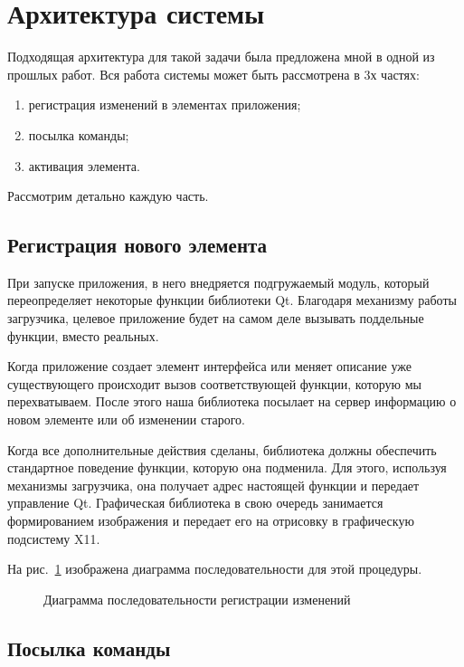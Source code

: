 \section{Архитектура системы}

Подходящая архитектура для такой задачи была предложена мной в одной из прошлых
работ\cite{polshakovinject}. Вся работа системы может быть рассмотрена в 3х
частях:

\begin{enumerate}
    \item регистрация изменений в элементах приложения;
    \item посылка команды;
    \item активация элемента.
\end{enumerate}

Рассмотрим детально каждую часть.

\subsection{Регистрация нового элемента}

При запуске приложения, в него внедряется подгружаемый модуль, который
переопределяет некоторые функции библиотеки Qt. Благодаря механизму работы
загрузчика, целевое приложение будет на самом деле вызывать поддельные
функции, вместо реальных.

Когда приложение создает элемент интерфейса или меняет описание уже
существующего происходит вызов соответствующей функции, которую мы
перехватываем. После этого наша библиотека посылает на сервер информацию
о новом элементе или об изменении старого.

Когда все дополнительные действия сделаны, библиотека должны обеспечить
стандартное поведение функции, которую она подменила. Для этого, используя
механизмы загрузчика, она получает адрес настоящей функции и передает
управление Qt. Графическая библиотека в свою очередь занимается формированием
изображения и передает его на отрисовку в графическую подсистему X11.

На рис.~\ref{fig:create-elem} изображена диаграмма последовательности для
этой процедуры.

\begin{figure}[h]
	\centering
	
	\caption{Диаграмма последовательности регистрации
		изменений}\label{fig:create-elem}
\end{figure}

\subsection{Посылка команды}

